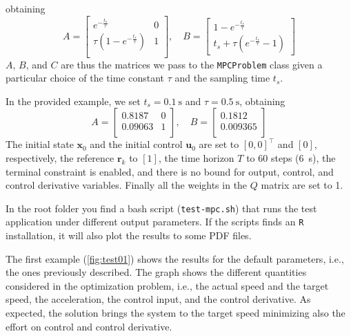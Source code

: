 \documentclass[10pt,a4paper]{article}
\newcommand{\xx}[1]{\ensuremath{\bm{x}_{#1}}\xspace}
\newcommand{\uu}[1]{\ensuremath{\bm{u}_{#1}}\xspace}
\newcommand{\rk}{\ensuremath{\bm{r}_k}\xspace}
\newcommand{\ts}{\ensuremath{t_s}}
\begin{document}
obtaining
\begin{equation}
    A = \begin{bmatrix}
        e^{-\frac{\ts}{\tau}} & 0\\
        \tau\left(1 - e^{-\frac{\ts}{\tau}}\right) & 1\\
    \end{bmatrix},\quad
    B = \begin{bmatrix}
        1 - e^{-\frac{\ts}{\tau}}\\
        \ts + \tau\left(e^{-\frac{\ts}{\tau}} - 1\right)
    \end{bmatrix}
\end{equation}
$A$, $B$, and $C$ are thus the matrices we pass to the \texttt{MPCProblem} class given a particular choice of the time constant $\tau$ and the sampling time \ts.

In the provided example, we set $\ts = \SI{0.1}{\second}$ and $\tau = \SI{0.5}{\second}$, obtaining
\begin{equation}
    A = \begin{bmatrix}
        0.8187 & 0\\
        0.09063 & 1\\
    \end{bmatrix},\quad
    B = \begin{bmatrix}
        0.1812\\
        0.009365\\
    \end{bmatrix}
\end{equation}
The initial state $\xx{0}$ and the initial control $\uu{0}$ are set to $[0, 0]^\intercal$ and $[0]$, respectively, the reference $\rk$ to $[1]$, the time horizon $T$ to 60 steps (\SI{6}{\second}), the terminal constraint is enabled, and there is no bound for output, control, and control derivative variables.
Finally all the weights in the $Q$ matrix are set to 1.

In the root folder you find a bash script (\texttt{test-mpc.sh}) that runs the test application under different output parameters.
If the scripts finds an \texttt{R} installation, it will also plot the results to some PDF files.

The first example (\cref{fig:test01}) shows the results for the default parameters, i.e., the ones previously described.
The graph shows the different quantities considered in the optimization problem, i.e., the actual speed and the target speed, the acceleration, the control input, and the control derivative.
As expected, the solution brings the system to the target speed minimizing also the effort on control and control derivative.
\end{document}
